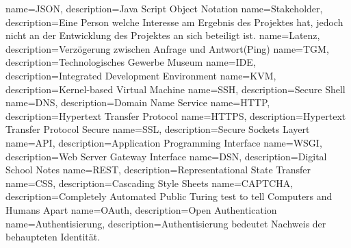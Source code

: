 \makeglossaries
{} {name=JSON, description={Java Script Object Notation}}
 {name=Stakeholder, description={Eine Person welche Interesse am Ergebnis des Projektes hat, jedoch nicht an der Entwicklung des Projektes an sich beteiligt ist.}}
 {name=Latenz, description={Verzögerung zwischen Anfrage und Antwort(Ping)}}
 {name=TGM, description={Technologisches Gewerbe Museum}}
 {name=IDE, description={Integrated Development Environment}}
 {name=KVM, description={Kernel-based Virtual Machine}}
 {name=SSH, description={Secure Shell}}
 {name=DNS, description={Domain Name Service}}
 {name=HTTP, description={Hypertext Transfer Protocol}}
 {name=HTTPS, description={Hypertext Transfer Protocol Secure}}
 {name=SSL, description={Secure Sockets Layert}}
 {name=API, description={Application Programming Interface}}
 {name=WSGI, description={Web Server Gateway Interface}}
 {name=DSN, description={Digital School Notes}}
 {name=REST, description={Representational State Transfer}}
 {name=CSS, description={Cascading Style Sheets}}
 {name=CAPTCHA, description={Completely Automated Public Turing test to tell Computers and Humans Apart}}
 {name=OAuth, description={Open Authentication}}
 {name=Authentisierung, description={Authentisierung bedeutet Nachweis der behaupteten Identität.}}

\renewcommand*\glspostdescription{\dotfill}

